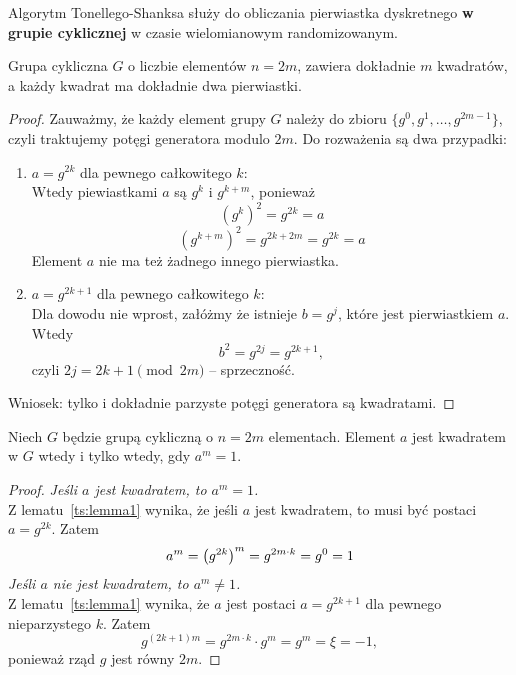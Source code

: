 Algorytm Tonellego-Shanksa służy do obliczania pierwiastka dyskretnego \textbf{w grupie cyklicznej} w czasie wielomianowym randomizowanym.

\begin{lemma}\label{ts:lemma1}
    Grupa cykliczna \( G \) o liczbie elementów \(n = 2m \), zawiera dokładnie \( m \) kwadratów, a każdy kwadrat ma dokładnie dwa pierwiastki.
\end{lemma}
\begin{proof}
    Zauważmy, że każdy element grupy \( G \) należy do zbioru \( \{g^0, g^1, \dots, g^{2m-1}\} \), czyli traktujemy potęgi generatora modulo \( 2m \). Do rozważenia są dwa przypadki:
    \begin{enumerate}
        \item \( a = g^{2k} \) dla pewnego całkowitego \( k \): \\
        Wtedy piewiastkami \( a \) są \( g^k \) i \( g^{k+m} \), ponieważ
        \[
            (g^k)^2 = g^{2k} = a
        \]
        \[
            (g^{k+m})^2 = g^{2k+2m} = g^{2k} = a
        \]
        Element \( a \) nie ma też żadnego innego pierwiastka.
        \item \( a = g^{2k+1} \) dla pewnego całkowitego \( k \): \\
        Dla dowodu nie wprost, załóżmy że istnieje \( b = g^j \), które jest pierwiastkiem \( a \). Wtedy
        \[
            b^2 = g^{2j} = g^{2k + 1},
        \]
        czyli \( 2j = 2k + 1 \pmod{2m} \) -- sprzeczność.
    \end{enumerate}
    Wniosek: tylko i dokładnie parzyste potęgi generatora są kwadratami.
\end{proof}

\begin{lemma}\label{A11:lemma2}
    Niech \( G \) będzie grupą cykliczną o \( n = 2m \) elementach. Element \( a \) jest kwadratem w \( G \) wtedy i tylko wtedy, gdy \( a^m = 1 \).
\end{lemma}
\begin{proof}
    \textit{Jeśli \( a \) jest kwadratem, to \( a^m = 1\).} \\
    Z lematu~\ref{ts:lemma1} wynika, że jeśli \( a \) jest kwadratem, to musi być postaci \( a = g^{2k} \). Zatem
    \[
        a^m = \left(g^{2k}\right)^m = g^{2m \cdot k} = g^0 = 1
    \]
    \textit{Jeśli \( a \) nie jest kwadratem, to \( a^m \neq 1\).} \\
    Z lematu~\ref{ts:lemma1} wynika, że \( a \) jest postaci \( a = g^{2k+1} \) dla pewnego nieparzystego \( k \). Zatem
    \[
        g^{(2k+1)m} = g^{2m \cdot k} \cdot g^m = g^m = \xi = -1,
    \]
    ponieważ rząd \( g \) jest równy \( 2m \).
\end{proof}

